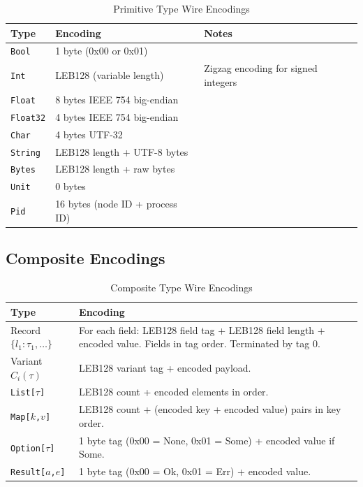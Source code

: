 \documentclass[11pt,a4paper]{article}
\begin{document}
\begin{table}[H]
\centering
\caption{Primitive Type Wire Encodings}
\begin{tabularx}{\textwidth}{llX}
\toprule
\textbf{Type} & \textbf{Encoding} & \textbf{Notes} \\
\midrule
\texttt{Bool}    & 1 byte (0x00 or 0x01)           & \\
\texttt{Int}     & LEB128 (variable length)         & Zigzag encoding for
                                                       signed integers \\
\texttt{Float}   & 8 bytes IEEE 754 big-endian      & \\
\texttt{Float32} & 4 bytes IEEE 754 big-endian      & \\
\texttt{Char}    & 4 bytes UTF-32                   & \\
\texttt{String}  & LEB128 length + UTF-8 bytes      & \\
\texttt{Bytes}   & LEB128 length + raw bytes        & \\
\texttt{Unit}    & 0 bytes                          & \\
\texttt{Pid}     & 16 bytes (node ID + process ID)  & \\
\bottomrule
\end{tabularx}
\end{table}

\subsection{Composite Encodings}

\begin{table}[H]
\centering
\caption{Composite Type Wire Encodings}
\begin{tabularx}{\textwidth}{lX}
\toprule
\textbf{Type} & \textbf{Encoding} \\
\midrule
Record $\{l_1:\tau_1, \ldots\}$ & For each field: LEB128 field tag +
  LEB128 field length + encoded value. Fields in tag order. Terminated
  by tag 0. \\
\addlinespace
Variant $C_i(\tau)$ & LEB128 variant tag + encoded payload. \\
\addlinespace
\texttt{List[$\tau$]} & LEB128 count + encoded elements in order. \\
\addlinespace
\texttt{Map[$k$,$v$]} & LEB128 count + (encoded key + encoded value)
  pairs in key order. \\
\addlinespace
\texttt{Option[$\tau$]} & 1 byte tag (0x00 = None, 0x01 = Some) +
  encoded value if Some. \\
\addlinespace
\texttt{Result[$a$,$e$]} & 1 byte tag (0x00 = Ok, 0x01 = Err) +
  encoded value. \\
\bottomrule
\end{tabularx}
\end{table}
\end{document}
